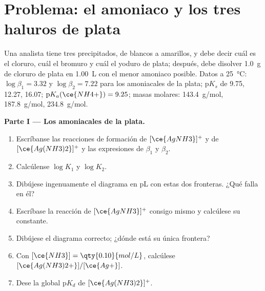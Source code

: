 \section{Problema: el amoniaco y los tres haluros de plata}

\begin{problem}
\label{pb:b1:complexation:1}
Una analista tiene tres precipitados, de blancos a amarillos, y debe
decir cuál es el cloruro, cuál el bromuro y cuál el yoduro de plata;
después, debe disolver \qty{1.0}{g} de cloruro de plata en \qty{1.00}{L}
con el menor amoniaco posible. Datos a \qty{25}{\celsius}:
$\log\beta_1 = 3.32$ y
$\log\beta_2 = 7.22$ para los  amoniacales de la plata;
$\mathrm{p}K_s$ de 
9.75,  12.27,  16.07; $\mathrm{p}K_a(\ce{NH4+}) = 9.25$;
masas molares:  \qty{143.4}{g/mol},  \qty{187.8}{g/mol},
 \qty{234.8}{g/mol}.

\medskip
\noindent\textbf{Parte I --- Los  amoniacales de la plata.}
\begin{enumerate}
  \item Escríbanse las reacciones de formación de $[\ce{AgNH3}]^{+}$ y de
        $[\ce{Ag(NH3)2}]^{+}$ y las expresiones de $\beta_1$ y $\beta_2$.
  \item Calcúlense $\log K_1$ y $\log K_2$.
  \item Dibújese ingenuamente el diagrama en pL con estas dos fronteras.
        ¿Qué falla en él?
  \item Escríbase la reacción de $[\ce{AgNH3}]^{+}$ consigo mismo y
        calcúlese su constante.
  \item Dibújese el diagrama correcto; ¿dónde está su única frontera?
  \item Con $[\ce{NH3}] = \qty{0.10}{mol/L}$, calcúlese
        $[\ce{Ag(NH3)2+}]/[\ce{Ag+}]$.
  \item Dese la  global $\mathrm{p}K_d$ de
        $[\ce{Ag(NH3)2}]^{+}$.
\end{enumerate}


\end{problem}

